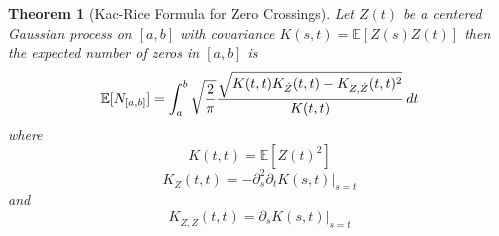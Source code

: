 \documentclass{article}
\newtheorem{theorem}{Theorem}
\begin{document}
\begin{theorem}[Kac-Rice Formula for Zero Crossings]
  \label{thm:kac_rice}Let $Z (t)$ be a centered Gaussian process on $[a, b]$
  with covariance $K (s, t) =\mathbb{E} [Z (s) Z (t)]$ then the expected
  number of zeros in $[a, b]$ is
  \begin{equation}
    \label{eq:kac_rice} \mathbb{E} [N_{[a, b]}] = \int_a^b
    \sqrt{\frac{2}{\pi}}  \frac{\sqrt{K (t, t) K_{\dot{Z}} (t, t) - K_{Z,
    \dot{Z}} (t, t)^2}}{K (t, t)}  \hspace{0.17em} dt
  \end{equation}
  where
  \begin{equation}
    K (t, t) =\mathbb{E} [Z (t)^2]
  \end{equation}
  \begin{equation}
    K_{\dot{Z}} (t, t) = - \partial^2_s \partial_t K (s, t) |_{s = t}
  \end{equation}
  and
  \begin{equation}
    K_{Z, \dot{Z}} (t, t) = \partial_s K (s, t) |_{s = t}
  \end{equation}
\end{theorem}
\end{document}
